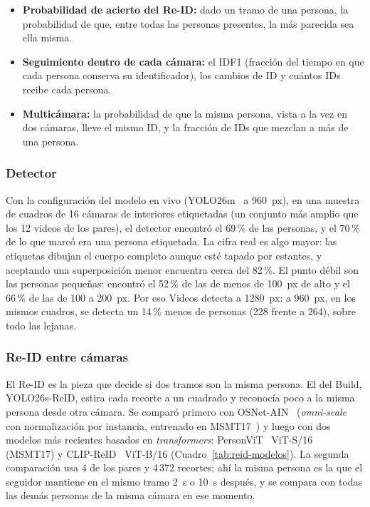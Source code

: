 \documentclass[12pt,a4paper]{article}
\begin{document}
\begin{itemize}
    \item \textbf{Probabilidad de acierto del Re-ID:} dado un tramo de una
    persona, la probabilidad de que, entre todas las personas presentes, la
    más parecida sea ella misma.
    \item \textbf{Seguimiento dentro de cada cámara:} el IDF1 (fracción del
    tiempo en que cada persona conserva su identificador), los cambios de ID y
    cuántos IDs recibe cada persona.
    \item \textbf{Multicámara:} la probabilidad de que la misma persona, vista
    a la vez en dos cámaras, lleve el mismo ID, y la fracción de IDs que
    mezclan a más de una persona.
\end{itemize}

\subsubsection{Detector}

Con la configuración del modelo en vivo (YOLO26m~\cite{yolo26} a 960~px), en una muestra de
cuadros de 16 cámaras de interiores etiquetadas (un conjunto más amplio que
los 12 videos de los pares), el detector encontró el
69\,\% de las personas, y el 70\,\% de lo que marcó era una persona
etiquetada. La cifra real es algo mayor: las etiquetas dibujan el cuerpo
completo aunque esté tapado por estantes, y aceptando una superposición menor
encuentra cerca del 82\,\%. El punto débil son las personas pequeñas:
encontró el 52\,\% de las de menos de 100~px de alto y el 66\,\% de las de
100 a 200~px. Por eso Videos detecta a 1280~px: a 960~px, en los mismos
cuadros, se detecta un 14\,\% menos de personas (228 frente a 264), sobre todo
las lejanas.

\subsubsection{Re-ID entre cámaras}

El Re-ID es la pieza que decide si dos tramos son la misma persona. El del
Build, YOLO26s-ReID, estira cada recorte a un cuadrado y reconocía poco a la
misma persona desde otra cámara. Se comparó primero con OSNet-AIN~\cite{zhou2022osnet}
(\textit{omni-scale} con normalización por instancia, entrenado en MSMT17~\cite{wei2018}) y
luego con dos modelos más recientes basados en \textit{transformers}:
PersonViT~\cite{hu2024personvit} ViT-S/16 (MSMT17) y CLIP-ReID~\cite{li2023clipreid} ViT-B/16
(Cuadro~\ref{tab:reid-modelos}). La segunda comparación usa 4 de los pares y
4\,372 recortes; ahí la misma persona es la que el seguidor mantiene en el
mismo tramo 2~s o 10~s después, y se compara con todas las demás personas de
la misma cámara en ese momento.
\end{document}

